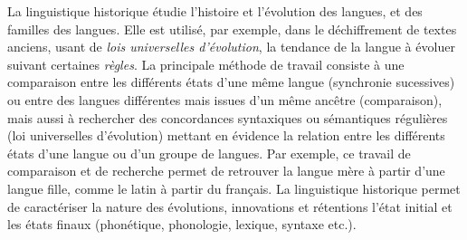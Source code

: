 \documentclass[12pt, french, twoside]{report}
\begin{document}
La linguistique historique étudie l'histoire et l'évolution des langues, et des familles des langues. Elle est utilisé, par exemple, dans le déchiffrement de textes anciens, usant de \textit{lois universelles d'évolution}, la tendance de la langue à évoluer suivant certaines \textit{règles}. La principale méthode de travail consiste à une comparaison entre les différents états d'une même langue (synchronie sucessives) ou entre des langues différentes mais issues d'un même ancêtre (comparaison), mais aussi à rechercher des concordances syntaxiques ou sémantiques régulières (loi universelles d'évolution) mettant en évidence la relation entre les différents états d'une langue ou d'un groupe de langues. Par exemple, ce travail de comparaison et de recherche permet de retrouver la langue mère à partir d'une langue fille, comme le latin à partir du français. La linguistique historique permet de caractériser la nature des évolutions, innovations et rétentions l'état initial et les états finaux (phonétique, phonologie, lexique, syntaxe etc.).\\

\end{document}
